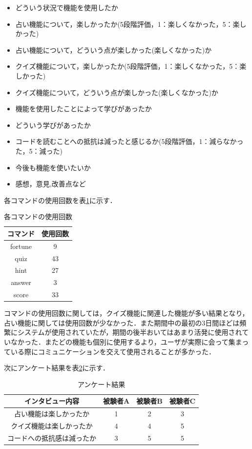 \begin{itemize}
  \item どういう状況で機能を使用したか
  \item 占い機能について，楽しかったか(5段階評価，1：楽しくなかった，5：楽しかった)
  \item 占い機能について，どういう点が楽しかった(楽しくなかった)か
  \item クイズ機能について，楽しかったか(5段階評価，1：楽しくなかった，5：楽しかった)
  \item クイズ機能について，どういう点が楽しかった(楽しくなかった)か
  \item 機能を使用したことによって学びがあったか
  \item どういう学びがあったか
  \item コードを読むことへの抵抗は減ったと感じるか(5段階評価，1：減らなかった，5：減った)
  \item 今後も機能を使いたいか
  \item 感想，意見,改善点など
\end{itemize}

各コマンドの使用回数を表\ref{command}に示す．

\begin{table}[!ht]
  \centering
  \caption{各コマンドの使用回数}
  \label{command}
    \begin{tabular}{|c|c|} \hline
      コマンド & 使用回数 \\ \hline \hline
      fortune & 9 \\ \hline
      quiz & 43 \\ \hline
      hint & 27 \\ \hline
      answer & 3 \\ \hline
      score & 33 \\ \hline
    \end{tabular}
\end{table}

コマンドの使用回数に関しては，クイズ機能に関連した機能が多い結果となり，占い機能に関しては使用回数が少なかった．また期間中の最初の3日間ほどは頻繁にシステムが使用されていたが，期間の後半おいてはあまり活発に使用されていなかった．またどの機能も個別に使用するより，ユーザが実際に会って集まっている際にコミュニケーションを交えて使用されることが多かった．

次にアンケート結果を表\ref{interview}に示す．
\begin{table}[!ht]
  \centering
  \caption{アンケート結果}
  \label{interview}
    \begin{tabular}{|c|c|c|c|} \hline
      インタビュー内容 & 被験者A & 被験者B & 被験者C \\ \hline \hline
      占い機能は楽しかったか & 1 & 2 & 3 \\ \hline
      クイズ機能は楽しかったか & 4 & 4 & 5 \\ \hline
      コードへの抵抗感は減ったか & 3 & 5 &5 \\ \hline
    \end{tabular}
\end{table}

